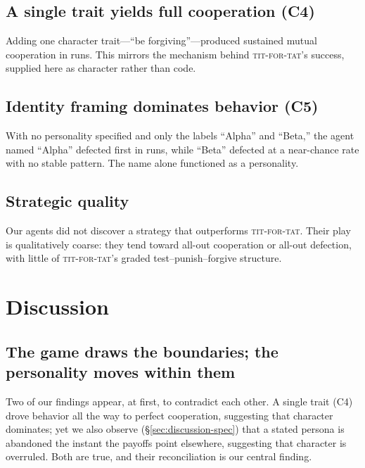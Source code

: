 \subsection{A single trait yields full cooperation (C4)}
Adding one character trait---``be forgiving''---produced sustained mutual cooperation in  runs. This mirrors the mechanism behind \textsc{tit-for-tat}'s success, supplied here as character rather than code.

\subsection{Identity framing dominates behavior (C5)}
With no personality specified and only the labels ``Alpha'' and ``Beta,'' the agent named ``Alpha'' defected first in  runs, while ``Beta'' defected at a near-chance rate with no stable pattern.  The name alone functioned as a personality.

\subsection{Strategic quality}
Our agents did not discover a strategy that outperforms \textsc{tit-for-tat}. Their play is qualitatively coarse: they tend toward all-out cooperation or all-out defection, with little of \textsc{tit-for-tat}'s graded test--punish--forgive structure. 

\section{Discussion}
\label{sec:discussion}

\subsection{The game draws the boundaries; the personality moves within them}
Two of our findings appear, at first, to contradict each other. A single trait (C4) drove behavior all the way to perfect cooperation, suggesting that character dominates; yet we also observe (\S\ref{sec:discussion-spec}) that a stated persona is abandoned the instant the payoffs point elsewhere, suggesting that character is overruled. Both are true, and their reconciliation is our central finding.

